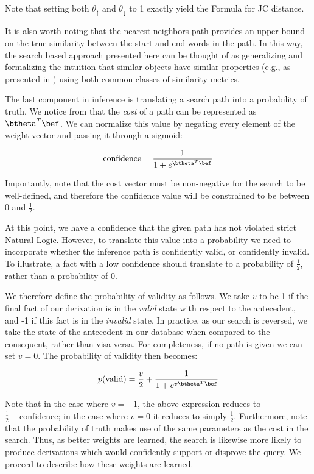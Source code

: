 Note that setting both $\theta_\uparrow$ and $\theta_\downarrow$ to 1 exactly
  yield the Formula  for JC distance.

It is also worth noting that the nearest neighbors path provides an
  upper bound on the true similarity between the start and end words
  in the path.
In this way, the search based approach presented here can be thought
  of as generalizing and formalizing the intuition that similar objects 
  have similar properties (e.g., as presented in
  ) using both common classes of similarity
  metrics.

%
%
The last component in inference is translating a search path into a
  probability of truth.
We notice from  that the \textit{cost}
  of a path can be represented as $\btheta^{T} \bef$.
We can normalize this value by negating every element of the weight
  vector and passing it through a sigmoid:

\begin{equation*}
\textrm{confidence} = \frac{1}{1 + e^{\btheta^{T} \bef}}
\end{equation*}

Importantly, note that the cost vector must be non-negative for the
  search to be well-defined, and therefore the confidence value will
  be constrained to be between 0 and $\frac{1}{2}$.

At this point, we have a confidence that the given path has not violated
  strict Natural Logic.
However, to translate this value into a probability
  we need to incorporate whether the inference path is
  confidently valid, or confidently invalid.
To illustrate, a fact with a low confidence should translate to a
  probability of $\frac{1}{2}$, rather than a probability of 0.

We therefore define the probability of validity as follows.
We take $v$ to be 1 if the final fact of our derivation is in the
  \textit{valid} state with respect to the antecedent,
  and -1 if this fact is in the \textit{invalid} state.
In practice, as our search is reversed, we take the state of the
  antecedent in our database when compared to the consequent, rather
  than visa versa.
For completeness, if no path is given we can set $v=0$.
The probability of validity then becomes:

\begin{equation}
  p(\textrm{valid}) = \frac{v}{2} + \frac{1}{1 + e^{v \btheta^{T} \bef}}
  \label{eqn:prob}
\end{equation}

Note that in the case where $v=-1$, the above expression reduces to
  $\frac{1}{2} - \textrm{confidence}$; in the case where $v=0$ it
  reduces to simply $\frac{1}{2}$.
Furthermore, note that the probability of truth makes use of the same
  parameters as the cost in the search.
Thus, as better weights are learned, the search is likewise more likely
  to produce derivations which would confidently support or disprove the
  query.
We proceed to describe how these weights are learned.
